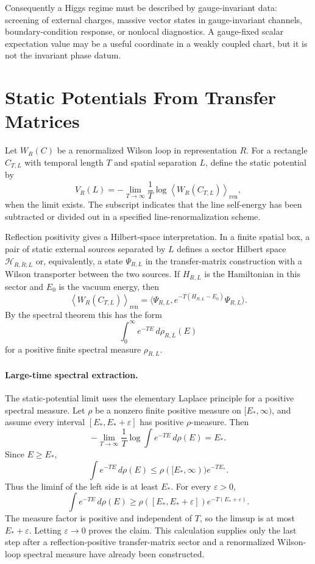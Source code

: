 Consequently a Higgs regime must be described by gauge-invariant data:
screening of external charges, massive vector states in gauge-invariant
channels, boundary-condition response, or nonlocal diagnostics.  A gauge-fixed
scalar expectation value may be a useful coordinate in a weakly coupled chart,
but it is not the invariant phase datum.

\section{Static Potentials From Transfer Matrices}

Let \(W_R(C)\) be a renormalized Wilson loop in representation \(R\).  For a
rectangle \(C_{T,L}\) with temporal length \(T\) and spatial separation \(L\),
define the static potential by
\begin{equation}
  V_R(L)=
  -\lim_{T\to\infty}\frac{1}{T}\log
  \left\langle W_R(C_{T,L})\right\rangle_{\mathrm{ren}},
  \label{eq:static-potential-definition}
\end{equation}
when the limit exists.  The subscript indicates that the line self-energy has
been subtracted or divided out in a specified line-renormalization scheme.

Reflection positivity gives a Hilbert-space interpretation.  In a finite
spatial box, a pair of static external sources separated by \(L\) defines a
sector Hilbert space \(\mathcal H_{R,\bar R;L}\) or, equivalently, a state
\(\Psi_{R,L}\) in the transfer-matrix construction with a Wilson transporter
between the two sources.  If \(H_{R,L}\) is the Hamiltonian in this sector and
\(E_0\) is the vacuum energy, then
\[
  \left\langle W_R(C_{T,L})\right\rangle_{\mathrm{ren}}
  =
  \langle\Psi_{R,L},
  e^{-T(H_{R,L}-E_0)}
  \Psi_{R,L}\rangle .
\]
By the spectral theorem this has the form
\[
  \int_{0}^{\infty} e^{-TE}\,d\rho_{R,L}(E)
\]
for a positive finite spectral measure \(\rho_{R,L}\).

\paragraph{Large-time spectral extraction.}
The static-potential limit uses the elementary Laplace principle for a
positive spectral measure.  Let \(\rho\) be a nonzero finite positive measure
on \([E_\ast,\infty)\), and assume every interval
\([E_\ast,E_\ast+\varepsilon]\) has positive \(\rho\)-measure.  Then
\[
  -\lim_{T\to\infty}\frac1T
  \log\int e^{-TE}\,d\rho(E)
  =
  E_\ast .
\]
Since \(E\geq E_\ast\),
\[
  \int e^{-TE}\,d\rho(E)
  \leq
  \rho([E_\ast,\infty))e^{-TE_\ast}.
\]
Thus the liminf of the left side is at least \(E_\ast\).  For every
\(\varepsilon>0\),
\[
  \int e^{-TE}\,d\rho(E)
  \geq
  \rho([E_\ast,E_\ast+\varepsilon])e^{-T(E_\ast+\varepsilon)}.
\]
The measure factor is positive and independent of \(T\), so the limsup is at
most \(E_\ast+\varepsilon\).  Letting \(\varepsilon\to0\) proves the claim.
This calculation supplies only the last step after a reflection-positive
transfer-matrix sector and a renormalized Wilson-loop spectral measure have
already been constructed.

